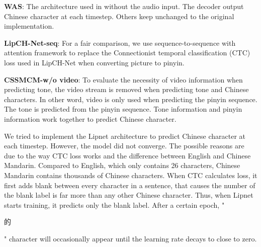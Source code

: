 \documentclass[sigconf]{acmart}
\begin{document}
\textbf{WAS}: The architecture used in \cite{chung2017lipWild} without the audio input. The decoder output Chinese character at each timestep. Others keep unchanged to the original implementation. 

\textbf{LipCH-Net-seq}: For a fair comparison, we use sequence-to-sequence with attention framework to replace the Connectionist temporal classification (CTC) loss \cite{graves2006connectionist} used in LipCH-Net \cite{zhang2019understanding} when converting picture to pinyin. 

\textbf{CSSMCM-w/o video}: To evaluate the necessity of video information when predicting tone, the video stream is removed when predicting tone and Chinese characters. In other word, video is only used when predicting the pinyin sequence. The tone is predicted from the pinyin sequence. Tone information and pinyin information work together to predict Chinese character.

We tried to implement the Lipnet architecture \cite{assael2016lipnet} to predict Chinese character at each timestep. However, the model did not converge. The possible reasons are due to the way CTC loss works and the difference between English and Chinese Mandarin. Compared to English, which only contains 26 characters, Chinese Mandarin contains thousands of Chinese characters. When CTC calculates loss, it first adds blank between every character in a sentence, that causes the number of the blank label is far more than any other Chinese character. Thus, when Lipnet starts training, it predicts only the blank label. After a certain epoch, "\begin{CJK*}{UTF8}{gbsn}的\end{CJK*}" character will occasionally appear until the learning rate decays to close to zero.
\end{document}
